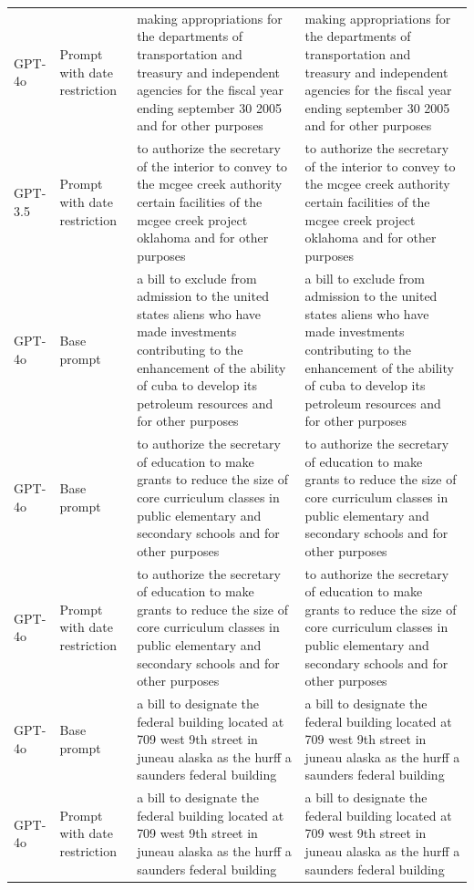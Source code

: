 \begin{longtable}{>{\raggedright\arraybackslash}p{1.4cm}>{\raggedright\arraybackslash}p{1.4cm}>{\raggedright\arraybackslash}p{5.5cm}>{\raggedright\arraybackslash}p{5.5cm}}
GPT-4o & Prompt with date restriction & making appropriations for the departments of transportation and treasury and independent agencies for the fiscal year ending september 30 2005 and for other purposes & making appropriations for the departments of transportation and treasury and independent agencies for the fiscal year ending september 30 2005 and for other purposes\\
GPT-3.5 & Prompt with date restriction & to authorize the secretary of the interior to convey to the mcgee creek authority certain facilities of the mcgee creek project oklahoma and for other purposes & to authorize the secretary of the interior to convey to the mcgee creek authority certain facilities of the mcgee creek project oklahoma and for other purposes\\
GPT-4o & Base prompt & a bill to exclude from admission to the united states aliens who have made investments contributing to the enhancement of the ability of cuba to develop its petroleum resources and for other purposes & a bill to exclude from admission to the united states aliens who have made investments contributing to the enhancement of the ability of cuba to develop its petroleum resources and for other purposes\\
GPT-4o & Base prompt & to authorize the secretary of education to make grants to reduce the size of core curriculum classes in public elementary and secondary schools and for other purposes & to authorize the secretary of education to make grants to reduce the size of core curriculum classes in public elementary and secondary schools and for other purposes\\
GPT-4o & Prompt with date restriction & to authorize the secretary of education to make grants to reduce the size of core curriculum classes in public elementary and secondary schools and for other purposes & to authorize the secretary of education to make grants to reduce the size of core curriculum classes in public elementary and secondary schools and for other purposes\\
GPT-4o & Base prompt & a bill to designate the federal building located at 709 west 9th street in juneau alaska as the hurff a saunders federal building & a bill to designate the federal building located at 709 west 9th street in juneau alaska as the hurff a saunders federal building\\
GPT-4o & Prompt with date restriction & a bill to designate the federal building located at 709 west 9th street in juneau alaska as the hurff a saunders federal building & a bill to designate the federal building located at 709 west 9th street in juneau alaska as the hurff a saunders federal building\\

\end{longtable}
